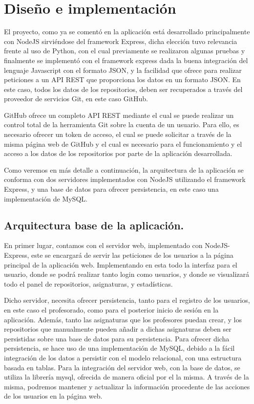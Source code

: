 \chapter{Diseño e implementación\label{05disenoTrabajo}}

El proyecto, como ya se comentó en la aplicación está desarrollado principalmente con NodeJS sirviéndose del framework Express, dicha elección tuvo relevancia frente al uso de Python, con el cual previamente se realizaron algunas pruebas\cite{PhytonGithub,GitHubWrappers} y finalmente se implementó con el framework express dada la buena integración del lenguaje Javascript con el formato JSON, y la facilidad que ofrece para realizar peticiones a un API REST que proporciona los datos en un formato JSON. En este caso, todos los datos de los repositorios, deben ser recuperados a través del proveedor de servicios Git, en este caso GitHub.

GitHub ofrece un completo API REST mediante el cual se puede realizar un control total de la herramienta Git sobre la cuenta de un usuario. Para ello, es necesario ofrecer un token de acceso, el cual se puede solicitar a través de la misma página web de GitHub y el cual es necesario para el funcionamiento y el acceso a los datos de los repositorios por parte de la aplicación desarrollada.

Como veremos en más detalle a continuación, la arquitectura de la aplicación se conforma con dos servidores implementados con NodeJS utilizando el framework Express, y una base de datos para ofrecer persistencia, en este caso una implementación de MySQL.




\section{Arquitectura base de la aplicación.}
En primer lugar, contamos con el servidor web, implementado con NodeJS-Express, este se encargará de servir las peticiones de los usuarios a la página principal de la aplicación web. Implementando en esta todo la interfaz para el usuario, donde se podrá realizar tanto login como usuarios, y donde se visualizará todo el panel de repositorios, asignaturas, y estadísticas.

Dicho servidor, necesita ofrecer persistencia, tanto para el registro de los usuarios, en este caso el profesorado,  como para el posterior inicio de sesión en la aplicación. Además, tanto las asignaturas que los profesores puedan crear, y los repositorios que manualmente pueden añadir a dichas asignaturas deben ser persistidas sobre una base de datos para su persistencia.
Para ofrecer dicha persistencia, se hace uso de una implementación de MySQL, debido a la fácil integración de los datos a persistir con el modelo relacional, con una estructura basada en tablas. Para la integración del servidor web, con la base de datos, se utiliza la librería mysql, ofrecida de manera oficial por el la misma. A través de la misma, podremos mantener y actualizar la información procedente de las acciones de los usuarios en la página web.


